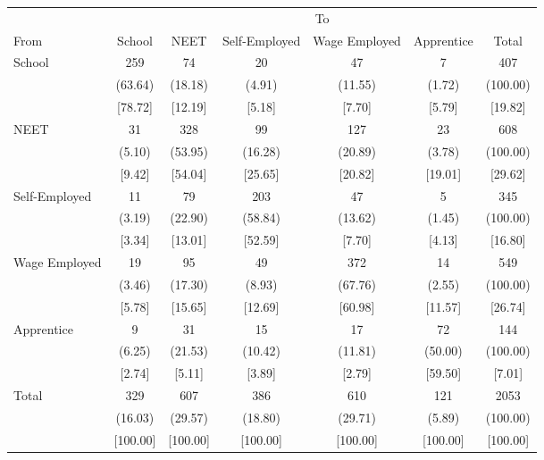 {
\def\sym#1{\ifmmode^{#1}\else\(^{#1}\)\fi}
\begin{tabular}{l*{6}{c}}
\hline\hline
            &\multicolumn{6}{c}{To}                                                       \\
From        &      School&        NEET&Self-Employed&Wage Employed&  Apprentice&       Total\\
\hline
School      &         259&          74&          20&          47&           7&         407\\
            &     (63.64)&     (18.18)&      (4.91)&     (11.55)&      (1.72)&    (100.00)\\
            &     [78.72]&     [12.19]&      [5.18]&      [7.70]&      [5.79]&     [19.82]\\
NEET        &          31&         328&          99&         127&          23&         608\\
            &      (5.10)&     (53.95)&     (16.28)&     (20.89)&      (3.78)&    (100.00)\\
            &      [9.42]&     [54.04]&     [25.65]&     [20.82]&     [19.01]&     [29.62]\\
Self-Employed&          11&          79&         203&          47&           5&         345\\
            &      (3.19)&     (22.90)&     (58.84)&     (13.62)&      (1.45)&    (100.00)\\
            &      [3.34]&     [13.01]&     [52.59]&      [7.70]&      [4.13]&     [16.80]\\
Wage Employed&          19&          95&          49&         372&          14&         549\\
            &      (3.46)&     (17.30)&      (8.93)&     (67.76)&      (2.55)&    (100.00)\\
            &      [5.78]&     [15.65]&     [12.69]&     [60.98]&     [11.57]&     [26.74]\\
Apprentice  &           9&          31&          15&          17&          72&         144\\
            &      (6.25)&     (21.53)&     (10.42)&     (11.81)&     (50.00)&    (100.00)\\
            &      [2.74]&      [5.11]&      [3.89]&      [2.79]&     [59.50]&      [7.01]\\
Total       &         329&         607&         386&         610&         121&        2053\\
            &     (16.03)&     (29.57)&     (18.80)&     (29.71)&      (5.89)&    (100.00)\\
            &    [100.00]&    [100.00]&    [100.00]&    [100.00]&    [100.00]&    [100.00]\\
\hline\hline
\end{tabular}
}

